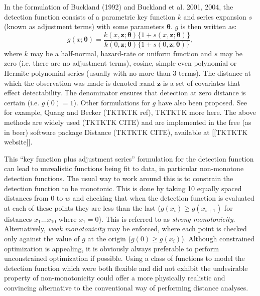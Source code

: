 \documentclass[useAMS,referee, usegraphicx]{biom}
\begin{document}
In the formulation of  Buckland (1992) and Buckland et al. 2001, 2004, the detection function consists of a parametric key function $k$ and series expansion $s$ (known as adjustment terms) with some parameters $\bm{\theta}$. $g$ is then written as:
\begin{equation*}
g(x; \bm{\theta}) = \frac{k(x, \mathbf{z}; \bm{\theta}) \{1+s(x, \mathbf{z}; \bm{\theta})\}}{k(0, \mathbf{z}; \bm{\theta}) \{1+s(0, \mathbf{z}; \bm{\theta})\}},
\end{equation*}
where $k$ may be a half-normal, hazard-rate or uniform function and $s$ may be zero (i.e. there are no adjustment terms), cosine, simple even polynomial or Hermite polynomial series (usually with no more than 3 terms). The distance at which the observation was made is denoted $x$and $\mathbf{z}$ is a set of covariates that effect detectability. The denominator ensures that detection at zero distance is certain (i.e. $g(0)=1$). Other formulations for $g$ have also been proposed. See for example, Quang and Becker (TKTKTK ref), TKTKTK more here. The above methods are widely used (TKTKTK CITE) and are implemented in the free (as in beer) software package Distance (TKTKTK CITE), available at [[TKTKTK website]].

This ``key function plus adjustment series'' formulation for the detection function can lead to unrealistic functions being fit to data, in particular non-monotone detection functions. The usual way to work around this is to constrain the detection function to be monotonic. This is done by taking 10 equally spaced distances from $0$ to $w$ and checking that when the detection function is evaluated at each of these points they are less than the last ($g(x_i)\geq g(x_{i+1})$ for distances $x_1 \dots x_{10}$ where $x_1=0$). This is referred to as \textit{strong monotonicity}. Alternatively, \textit{weak monotonicity} may be enforced, where each point is checked only against the value of $g$ at the origin ($g(0)\geq g(x_i)$). Although constrained optimization is appealing, it is obviously always preferable to perform unconstrained optimization if possible. Using a class of functions to model the detection function which were both flexible and did not exhibit the undesirable property of non-monotonicity could offer a more physically realistic and convincing alternative to the conventional way of performing distance analyses.
\end{document}
